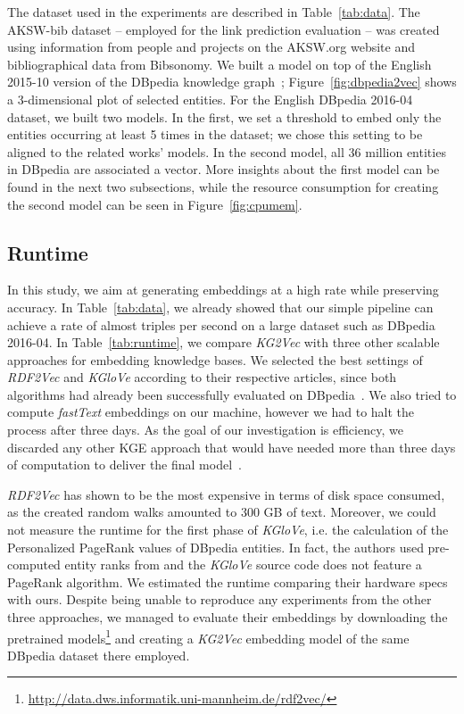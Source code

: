 \documentclass[graybox]{archivesofdatascience}
\newcommand{\ktvplain}{KG2Vec\xspace}
\newcommand{\ktv}{\textit{\ktvplain}\xspace}
\newcommand{\rtv}{\textit{RDF2Vec}\xspace}
\newcommand{\kgl}{\textit{KGloVe}\xspace}
\begin{document}
The dataset used in the experiments are described in Table~\ref{tab:data}.
The AKSW-bib dataset -- employed for the link prediction evaluation -- was created using information from people and projects on the AKSW.org website and bibliographical data from Bibsonomy.
We built a model on top of the English 2015-10 version of the DBpedia knowledge graph~\citep{dbpedia_jws_09}; Figure~\ref{fig:dbpedia2vec} shows a 3-dimensional plot of selected entities. 
For the English DBpedia 2016-04 dataset, we built two models.
In the first, we set a threshold to embed only the entities occurring at least 5 times in the dataset; we chose this setting to be aligned to the related works' models.
In the second model, all 36 million entities in DBpedia are associated a vector.
More insights about the first model can be found in the next two subsections, while the resource consumption for creating the second model can be seen in Figure~\ref{fig:cpumem}.


\subsection{Runtime}



In this study, we aim at generating embeddings at a high rate while preserving accuracy.
In Table~\ref{tab:data}, we already showed that our simple pipeline can achieve a rate of almost  triples per second on a large dataset such as DBpedia 2016-04.
In Table~\ref{tab:runtime}, we compare \ktv with three other scalable approaches for embedding knowledge bases.
We selected the best settings of \rtv and \kgl according to their respective articles, since both algorithms had already been successfully evaluated on DBpedia~\citep{ristoski2016rdf2vec,cochez2017global}.
We also tried to compute \textit{fastText} embeddings on our machine, however we had to halt the process after three days.
As the goal of our investigation is efficiency, we discarded any other KGE approach that would have needed more than three days of computation to deliver the final model~\citep{cochez2017global}.

\rtv has shown to be the most expensive in terms of disk space consumed, as the created random walks amounted to 300 GB of text.
Moreover, we could not measure the runtime for the first phase of \kgl, i.e. the calculation of the Personalized PageRank values of DBpedia entities.
In fact, the authors used pre-computed entity ranks from \cite{Thalhammer2016} and the \kgl source code does not feature a PageRank algorithm.
We estimated the runtime comparing their hardware specs with ours.
Despite being unable to reproduce any experiments from the other three approaches, we managed to evaluate their embeddings by downloading the pretrained models\footnote{\url{http://data.dws.informatik.uni-mannheim.de/rdf2vec/}} and creating a \ktv embedding model of the same DBpedia dataset there employed.
\end{document}
